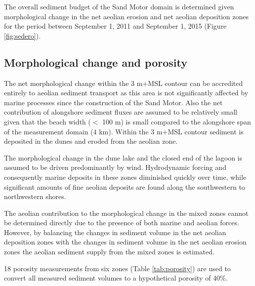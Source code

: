 The overall sediment budget of the Sand Motor domain is determined
given morphological change in the net aeolian erosion and net aeolian
deposition zones for the period between September 1, 2011 and
September 1, 2015 (Figure \ref{fig:sedero}).

\subsection{Morphological change and porosity}

The net morphological change within the 3 m+MSL contour can be
accredited entirely to aeolian sediment transport as this area is not
significantly affected by marine processes since the construction of
the Sand Motor. Also the net contribution of alongshore sediment
fluxes are assumed to be relatively small given that the beach width
($<$ 100 m) is small compared to the alongshore span of the
measurement domain (4 km). Within the 3 m+MSL contour sediment is
deposited in the dunes and eroded from the aeolian zone.

The morphological change in the dune lake and the closed end of the
lagoon is assumed to be driven predominantly by wind. Hydrodynamic
forcing and consequently marine deposits in these zones diminished
quickly over time, while significant amounts of fine aeolian deposits
are found along the southwestern to northwestern shores. 

The aeolian contribution to the morphological change in the mixed
zones cannot be determined directly due to the presence of both marine
and aeolian forces. However, by balancing the changes in sediment
volume in the net aeolian deposition zones with the changes in
sediment volume in the net aeolian erosion zones the aeolian sediment
supply from the mixed zones is estimated. 

18 porosity measurements from six zones (Table \ref{tab:porosity}) are
used to convert all measured sediment volumes to a hypothetical
porosity of 40\%.

